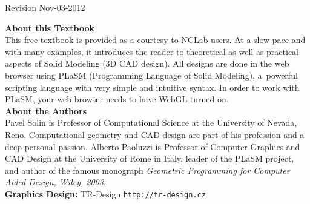 \documentclass[article,A4,12pt]{llncs}
\begin{document}
\pagestyle{empty}







\newpage
\vbox{}
\newpage
\vbox{}
\vfill

\centerline{Revision Nov-03-2012}

\newpage





\noindent
{\bf About this Textbook}\\[4mm]
This free textbook is provided as a courtesy to NCLab users. At a slow pace
and with many examples, it introduces the reader to theoretical as well as
practical aspects of Solid Modeling (3D CAD design). All designs are done in the web 
browser using PLaSM (Programming Language of Solid Modeling), a~powerful 
scripting language with very simple and intuitive syntax. In order to work 
with PLaSM, your web browser needs to have WebGL turned on.\\[4mm]

\noindent
{\bf About the Authors}\\[4mm]
Pavel Solin is Professor of Computational Science at the University of Nevada, Reno. 
Computational geometry and CAD design are part of his profession and a deep personal 
passion. Alberto Paoluzzi is Professor of Computer Graphics and CAD Design at the 
University of Rome in Italy, leader of the PLaSM project, and author of the famous 
monograph {\em Geometric Programming for Computer Aided Design, Wiley, 2003}.\\[4mm]

\noindent
{\bf Graphics Design:} TR-Design {\tt http://tr-design.cz}

%
%
\end{document}
